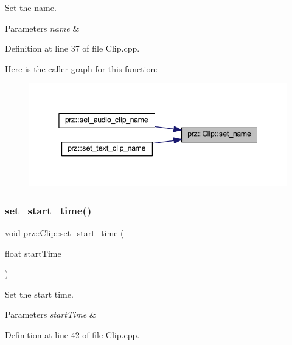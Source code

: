 Set the name. 


\begin{DoxyParams}{Parameters}
{\em name} & \\
\hline
\end{DoxyParams}


Definition at line 37 of file Clip.\+cpp.

Here is the caller graph for this function\+:
\nopagebreak
\begin{figure}[H]
\begin{center}
\leavevmode
\includegraphics[width=345pt]{classprz_1_1_clip_a4228c95183be5c9e2bd9eabd58828243_icgraph}
\end{center}
\end{figure}
\mbox{\label{classprz_1_1_clip_a7cbb55c3a344ab273d655f3b1e3fe5d1}} 
\subsubsection{\texorpdfstring{set\_start\_time()}{set\_start\_time()}}
{\footnotesize\ttfamily void prz\+::\+Clip\+::set\+\_\+start\+\_\+time (\begin{DoxyParamCaption}\item[{float}]{start\+Time }\end{DoxyParamCaption})}



Set the start time. 


\begin{DoxyParams}{Parameters}
{\em start\+Time} & \\
\hline
\end{DoxyParams}


Definition at line 42 of file Clip.\+cpp.

